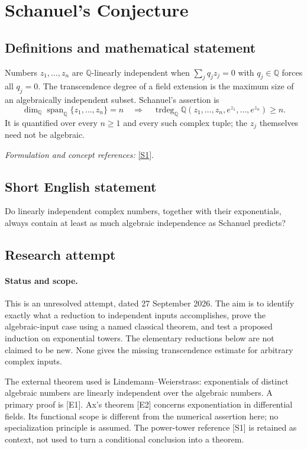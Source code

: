 \documentclass[11pt]{article}
\begin{document}
\section*{\texorpdfstring{Schanuel's Conjecture}{Schanuel's Conjecture}}\label{3367}
\subsection{Definitions and mathematical statement}
Numbers $z_1,\ldots,z_n$ are ${\mathbb{Q}}$-linearly independent when $\sum_jq_jz_j=0$ with $q_j\in{\mathbb{Q}}$ forces all $q_j=0$. The transcendence degree of a field extension is the maximum size of an algebraically independent subset. Schanuel's assertion is
\[
 \dim_{{\mathbb{Q}}}\operatorname{span}_{{\mathbb{Q}}}\{z_1,\ldots,z_n\}=n
 \quad\Longrightarrow\quad
 \operatorname{trdeg}_{{\mathbb{Q}}}{\mathbb{Q}}(z_1,\ldots,z_n,e^{z_1},\ldots,e^{z_n})\ge n.
\]
It is quantified over every $n\ge1$ and every such complex tuple; the $z_j$ themselves need not be algebraic.
\par\smallskip\textit{Formulation and concept references:} \href{https://www.mdpi.com/2227-7390/9/7/717}{[S1]}.

\subsection{Short English statement}
Do linearly independent complex numbers, together with their exponentials, always contain at least as much algebraic independence as Schanuel predicts?
\subsection{Research attempt}
\paragraph{Status and scope.}
This is an unresolved attempt, dated 27 September 2026. The aim is to
identify exactly what a reduction to independent inputs accomplishes, prove
the algebraic-input case using a named classical theorem, and test a proposed
induction on exponential towers. The elementary reductions below are not
claimed to be new. None gives the missing transcendence estimate for arbitrary
complex inputs.

The external theorem used is Lindemann--Weierstrass: exponentials of distinct
algebraic numbers are linearly independent over the algebraic numbers. A
primary proof is [E1]. Ax's theorem [E2] concerns exponentiation in differential
fields. Its functional scope is different from the numerical assertion here;
no specialization principle is assumed. The power-tower reference [S1] is
retained as context, not used to turn a conditional conclusion into a theorem.
\end{document}
